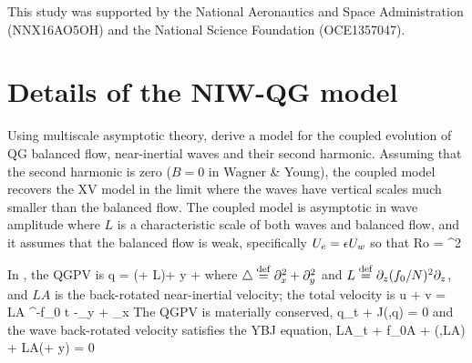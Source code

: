 \documentclass{jfm}
\begin{document}


\vspace{1.cm}
This study was supported by the National Aeronautics and Space Administration (NNX16AO5OH)
and the National Science Foundation (OCE1357047).

%
%

\appendix

\section{Details of the NIW-QG model}\label{WY16}

Using multiscale asymptotic theory, \cite{wagner_young2016} derive a
model for the coupled evolution of QG balanced flow, near-inertial
waves and their second harmonic. Assuming that the second harmonic is zero ($B=0$
in Wagner \& Young), the \cite{wagner_young2016} coupled model recovers the XV
model in the limit where the waves have vertical scales much smaller than the balanced
flow. The coupled model is asymptotic in wave amplitude
\beq
\ep {} {} \com
\eeq
where $L$ is a characteristic scale of both waves and balanced flow,
and it assumes that the balanced flow is weak, specifically $U_e = \epsilon U_w$ so that
\beq
Ro  {} = \ep^2\per
\eeq

In \cite{wagner_young2016}, the QGPV is
\beq\label{qgpv_wy}
q = (\lap + L)\psi + \beta y + \com
\eeq
where $\triangle \stackrel{\mathrm{def}}{=} \partial_x^2 + \partial_y^2$ and $L\stackrel{\mathrm{def}}{=} \partial_z (f_0/N)^2 \partial_z$, and $LA$
is the back-rotated near-inertial velocity; the total velocity is
\beq
u + \ii v = LA \ee^{-\ii f_0 t} -\psi_y + \ii\psi_x\per
\eeq
The QGPV is materially conserved,
\beq
q_t + J(\psi,q) = 0\com
\eeq
and the wave back-rotated velocity satisfies the YBJ
equation,
\beq
LA_t + f_0\lap A + \sJ(\psi,LA) + \ii LA(\half\lap\psi + \beta y)
= 0\per
\eeq
\end{document}

